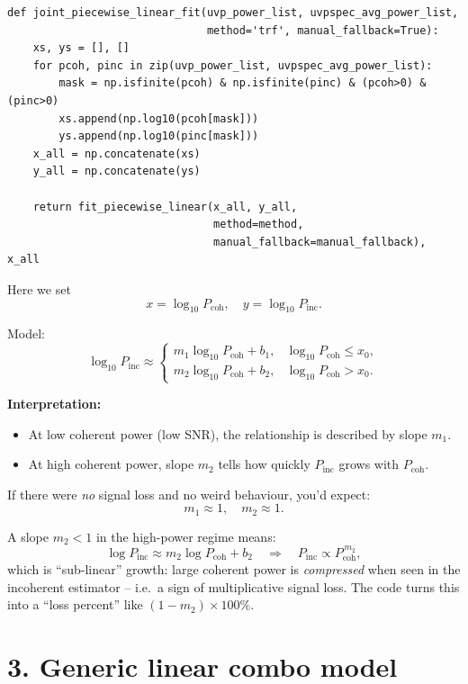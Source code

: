 \documentclass[11pt]{article}
\begin{document}
\begin{verbatim}
def joint_piecewise_linear_fit(uvp_power_list, uvpspec_avg_power_list,
                               method='trf', manual_fallback=True):
    xs, ys = [], []
    for pcoh, pinc in zip(uvp_power_list, uvpspec_avg_power_list):
        mask = np.isfinite(pcoh) & np.isfinite(pinc) & (pcoh>0) & (pinc>0)
        xs.append(np.log10(pcoh[mask]))
        ys.append(np.log10(pinc[mask]))
    x_all = np.concatenate(xs)
    y_all = np.concatenate(ys)

    return fit_piecewise_linear(x_all, y_all,
                                method=method,
                                manual_fallback=manual_fallback), x_all
\end{verbatim}

Here we set
\[
  x = \log_{10} P_{\mathrm{coh}}, \quad
  y = \log_{10} P_{\mathrm{inc}}.
\]

Model:
\[
  \log_{10} P_{\mathrm{inc}} \approx
  \begin{cases}
    m_1 \log_{10} P_{\mathrm{coh}} + b_1,
    & \log_{10} P_{\mathrm{coh}} \le x_0, \\[3pt]
    m_2 \log_{10} P_{\mathrm{coh}} + b_2,
    & \log_{10} P_{\mathrm{coh}} > x_0.
  \end{cases}
\]

\textbf{Interpretation:}

\begin{itemize}[leftmargin=*]
  \item At low coherent power (low SNR), the relationship is described by slope $m_1$.
  \item At high coherent power, slope $m_2$ tells how quickly $P_{\mathrm{inc}}$ grows with $P_{\mathrm{coh}}$.
\end{itemize}

If there were \emph{no} signal loss and no weird behaviour, you’d expect:
\[
  m_1 \approx 1, \quad m_2 \approx 1.
\]

A slope $m_2 < 1$ in the high-power regime means:
\[
  \log P_{\mathrm{inc}} \approx m_2 \log P_{\mathrm{coh}} + b_2
  \quad\Rightarrow\quad
  P_{\mathrm{inc}} \propto P_{\mathrm{coh}}^{\,m_2},
\]
which is ``sub-linear'' growth: large coherent power is \emph{compressed} when seen in the incoherent estimator -- i.e.\ a sign of multiplicative signal loss. The code turns this into a ``loss percent'' like $(1-m_2)\times 100\%$.

\section*{3. Generic linear combo model}
\end{document}
